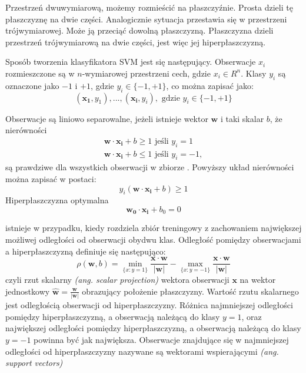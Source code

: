 \documentclass[a4paper,12pt,twoside,openany]{report}
\newcommand{\ang}[1]{\textit{(ang. #1)}}
\begin{document}
Przestrzeń dwuwymiarową, możemy rozmieścić na płaszczyźnie. 
Prosta dzieli tę płaszczyznę na dwie części.
Analogicznie sytuacja przestawia się w przestrzeni trójwymiarowej.
Może ją przeciąć dowolną płaszczyzną.
Płaszczyzna dzieli przestrzeń trójwymiarową na dwie części, jest więc jej hiperpłaszczyzną.

Sposób tworzenia klasyfikatora SVM jest się następujący.
Obserwacje $x_i$ rozmieszczone są w $n$-wymiarowej przestrzeni cech, gdzie $x_i \in R^n$.
Klasy $y_i$ są oznaczone jako $-1$ i $+1$, gdzie $y_i \in \{-1, +1\}$, co można zapisać jako:
\begin{equation}
	(\bm{x_1},y_1), ..., (\bm{x_i}, y_i), \textrm{ gdzie } y_i \in \{-1, +1\}
\end{equation}

Obserwacje są liniowo separowalne, jeżeli istnieje wektor $\bm{w}$ i taki skalar $b$, że nierówności
\begin{gather}
	\bm{w} \cdot \bm{x_i} + b \geq 1 \textrm{ jeśli } y_i = 1\\
	\bm{w} \cdot \bm{x_i} + b \leq 1 \textrm{ jeśli } y_i = -1,
\end{gather}
są prawdziwe dla wszystkich obserwacji w zbiorze \cite{Cortes1995}.
Powyższy układ nierówności można zapisać w postaci:
\begin{equation}
	y_i(\bm{w} \cdot \bm{x_i} + b) \geq 1
\end{equation}
Hiperpłaszczyzna optymalna 
\begin{equation}
	\bm{w_0} \cdot \bm{x_i}  + b_0 = 0
\end{equation}

istnieje w przypadku, kiedy rozdziela zbiór treningowy z zachowaniem największej możliwej odległości od obserwacji obydwu klas.
Odległość pomiędzy obserwacjami a hiperpłaszczyzną definiuje się następująco:
\begin{equation}
	\rho(\bm{w}, b) = \min\limits_{\{x:y=1\}} \frac{\bm{x} \cdot \bm{w}} {|\bm{w}|} - \max\limits_{\{x:y=-1\}}  \frac{\bm{x} \cdot \bm{w}} {|\bm{w}|} 
\end{equation}
czyli rzut skalarny \ang{scalar projection} wektora obserwacji $\bm{x}$ na wektor jednostkowy $\hat{\bm{w}} = \frac{\bm{w}}{|\bm{w}|}$
obrazujący położenie płaszczyzny.
Wartość rzutu skalarnego jest odległością obserwacji od hiperpłaszczyzny. 
Różnica najmniejszej odległości pomiędzy hiperpłaszczyzną, a obserwacją należącą do klasy $y=1$,
oraz największej odległości pomiędzy hiperpłaszczyzną, a obserwacją należącą do klasy $y=-1$ 
powinna być jak największa.
Obserwacje znajdujące się w najmniejszej odległości od hiperpłaszczyzny nazywane są wektorami wspierającymi \ang{support vectors}
\end{document}
